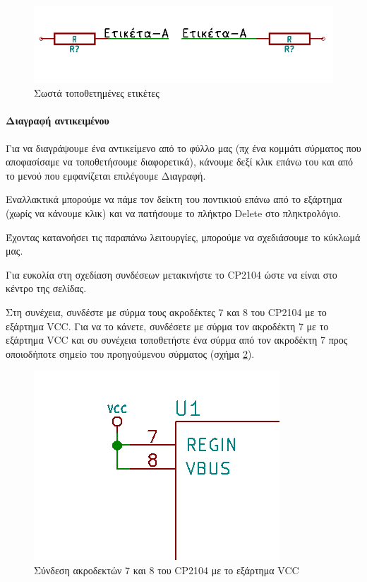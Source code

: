 \documentclass[a4paper]{article}
\begin{document}
\begin{figure}
  \begin{center}
    \includegraphics[width=.35\textwidth]{img/eesch-circ-lblok.png}
    \caption{Σωστά τοποθετημένες ετικέτες}
    \label{fig:eesch-circ-lblok}
  \end{center}
\end{figure}

\paragraph{Διαγραφή αντικειμένου}
Για να διαγράψουμε ένα αντικείμενο από το φύλλο μας (πχ ένα κομμάτι σύρματος που αποφασίσαμε να τοποθετήσουμε διαφορετικά), κάνουμε δεξί κλικ επάνω του και από το μενού που εμφανίζεται επιλέγουμε Διαγραφή.

Εναλλακτικά μπορούμε να πάμε τον δείκτη του ποντικιού επάνω από το εξάρτημα (χωρίς να κάνουμε κλικ) και να πατήσουμε το πλήκτρο Delete στο πληκτρολόγιο.

Έχοντας κατανοήσει τις παραπάνω λειτουργίες, μπορούμε να σχεδιάσουμε το κύκλωμά μας.

Για ευκολία στη σχεδίαση συνδέσεων μετακινήστε το CP2104 ώστε να είναι στο κέντρο της σελίδας.

Στη συνέχεια, συνδέστε με σύρμα τους ακροδέκτες 7 και 8 του CP2104 με το εξάρτημα VCC. Για να το κάνετε, συνδέσετε με σύρμα τον ακροδέκτη 7 με το εξάρτημα VCC και συ συνέχεια τοποθετήστε ένα σύρμα από τον  ακροδέκτη 7 προς οποιοδήποτε σημείο του προηγούμενου σύρματος (σχήμα \ref{fig:eesch-circ-78vcc}).

\begin{figure}
  \begin{center}
    \includegraphics[width=.35\textwidth]{img/eesch-circ-78vcc.png}
    \caption{Σύνδεση ακροδεκτών 7 και 8 του CP2104 με το εξάρτημα VCC}
    \label{fig:eesch-circ-78vcc}
  \end{center}
\end{figure}
\end{document}
